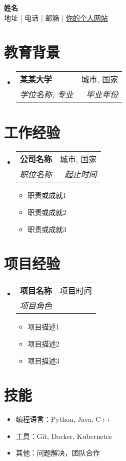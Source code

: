 \documentclass[a4paper,10pt]{article}
\makeatletter
\newcommand{\resumeItem}[1]{
	\item\small{
		{#1 \vspace{-2pt}}
	}
}
\newcommand{\resumeSubheading}[4]{
	\vspace{-1pt}
	\item
	\begin{tabular*}{1\textwidth}[t]{l@{\extracolsep{\fill}}r}
		\textbf{#1} & #2 \\
		\textit{#3} & \textit{#4} \\
	\end{tabular*}\vspace{-5pt}
}
\newcommand{\resumeItemListStart}{\begin{itemize}[leftmargin=0.15in, label={}]}
\newcommand{\resumeItemListEnd}{\end{itemize}\vspace{-5pt}}
\newcommand{\resumeSection}[1]{\section*{\uppercase{#1}}}
\makeatother
\begin{document}
	
	\begin{center}
		{\LARGE \textbf{姓名}} \\
		\vspace{2pt}
		地址 | 电话 | 邮箱 | \href{http://你的个人网站.com}{你的个人网站}
	\end{center}
	
	\resumeSection{教育背景}
	\resumeItemListStart
	\resumeSubheading
	{某某大学}{城市, 国家}
	{学位名称; 专业}{毕业年份}
	\resumeItemListEnd
	
	\resumeSection{工作经验}
	\resumeItemListStart
	\resumeSubheading
	{公司名称}{城市, 国家}
	{职位名称}{起止时间}
	\resumeItemListStart
	\resumeItem{职责或成就1}
	\resumeItem{职责或成就2}
	\resumeItem{职责或成就3}
	\resumeItemListEnd
	\resumeItemListEnd
	
	\resumeSection{项目经验}
	\resumeItemListStart
	\resumeSubheading
	{项目名称}{项目时间}
	{项目角色}{}
	\resumeItemListStart
	\resumeItem{项目描述1}
	\resumeItem{项目描述2}
	\resumeItem{项目描述3}
	\resumeItemListEnd
	\resumeItemListEnd
	
	\resumeSection{技能}
	\resumeItemListStart
	\resumeItem{编程语言：Python, Java, C++}
	\resumeItem{工具：Git, Docker, Kubernetes}
	\resumeItem{其他：问题解决，团队合作}
	\resumeItemListEnd
	
\end{document}

